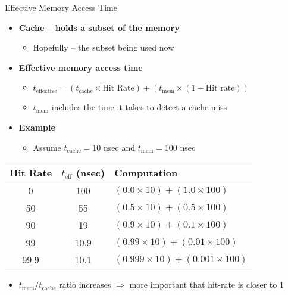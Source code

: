 \documentclass[aspectratio=169,12pt]{beamer}
\begin{document}
\begin{frame}{Effective Memory Access Time}
\begin{itemize}
  \item \textbf{Cache -- holds a subset of the memory}
  \begin{itemize}
    \item Hopefully -- the subset being used now
  \end{itemize}
  
  \item \textbf{Effective memory access time}
  \begin{itemize}
    \item $t_{\text{effective}} = (t_{\text{cache}} \times \text{Hit Rate}) + (t_{\text{mem}} \times (1 - \text{Hit rate}))$
    \item $t_{\text{mem}}$ includes the time it takes to detect a cache miss
  \end{itemize}
  
  \item \textbf{Example}
  \begin{itemize}
    \item Assume $t_{\text{cache}} = 10$ nsec and $t_{\text{mem}} = 100$ nsec
  \end{itemize}
\end{itemize}

\begin{center}
\begin{tabular}{c|c|l}
\textbf{Hit Rate} & \textbf{$t_{\text{eff}}$ (nsec)} & \textbf{Computation} \\
\hline
0 & 100 & $(0.0 \times 10) + (1.0 \times 100)$ \\
50 & 55 & $(0.5 \times 10) + (0.5 \times 100)$ \\
90 & 19 & $(0.9 \times 10) + (0.1 \times 100)$ \\
99 & 10.9 & $(0.99 \times 10) + (0.01 \times 100)$ \\
99.9 & 10.1 & $(0.999 \times 10) + (0.001 \times 100)$ \\
\end{tabular}
\end{center}

\begin{itemize}
  \item $t_{\text{mem}}/t_{\text{cache}}$ ratio increases $\Rightarrow$ more important that hit-rate is closer to 1
\end{itemize}
\end{frame}
\end{document}
